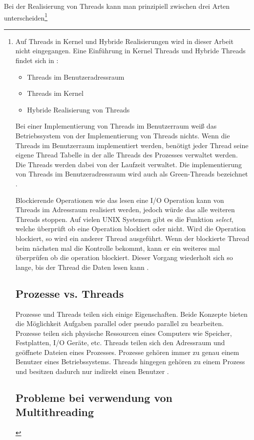 Bei der Realisierung von Threads kann man prinzipiell zwischen drei Arten unterscheiden\footnote{Auf Threads in Kernel und Hybride Realisierungen wird in dieser Arbeit nicht eingegangen. Eine Einführung in Kernel Threads und Hybride Threads findet sich in \cite[p. 109-110]{tan09}:

\begin{itemize}
  \item Threads im Benutzeradressraum
  \item Threads im Kernel 
  \item Hybride Realisierung von Threads
\end{itemize}

Bei einer Implementierung von Threads im Benutzerraum weiß das Betriebssystem von der Implementierung von Threads nichts. Wenn die Threads im Benutzerraum implementiert werden, benötigt jeder Thread seine eigene Thread Tabelle in der alle Threads des Prozesses verwaltet werden. Die Threads werden dabei von der Laufzeit verwaltet. Die implementierung von Threads im Benutzeradressraum wird auch als Green-Threads bezeichnet \cite[p. 106]{tan09}.

Blockierende Operationen wie das lesen eine I/O Operation kann von Threads im Adressraum realisiert werden, jedoch würde das alle weiteren Threads stoppen. Auf vielen UNIX Systemen gibt es die Funktion \emph{select}, welche überprüft ob eine Operation blockiert oder nicht. Wird die Operation blockiert, so wird ein anderer Thread ausgeführt. Wenn der blockierte Thread beim nächsten mal die Kontrolle bekommt, kann er ein weiteres mal überprüfen ob die operation blockiert. Dieser Vorgang wiederholt sich so lange, bis der Thread die Daten lesen kann \cite[p. 108]{tan09}. 


\section{Prozesse vs. Threads}

Prozesse und Threads teilen sich einige Eigenschaften. Beide Konzepte bieten die Möglichkeit Aufgaben parallel oder pseudo parallel zu bearbeiten. Prozesse teilen sich physische Ressourcen eines Computers wie Speicher, Festplatten, I/O Geräte, etc. Threads teilen sich den Adressraum und geöffnete Dateien eines Prozesses. Prozesse gehören immer zu genau einem Benutzer eines Betriebssystems. Threads hingegen gehören zu einem Prozess und besitzen dadurch nur indirekt einen Benutzer \cite[p. 89]{tan09}. 


\subsection{Probleme bei verwendung von Multithreading}

}
